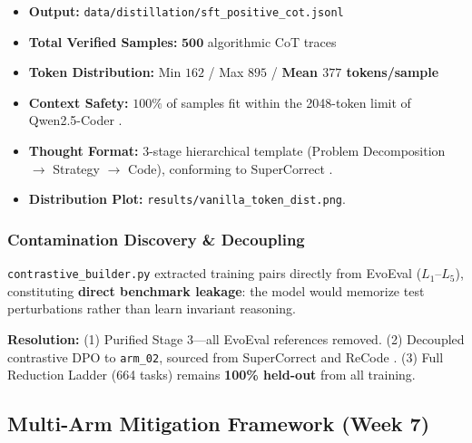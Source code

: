 \documentclass[12pt, a4paper]{article}
\begin{document}
\begin{researchbox}[title={\faDatabase\ NB-03 Distillation Statistics}]
\begin{itemize}[leftmargin=*]
  \item \textbf{Output:} \texttt{data/distillation/sft\_positive\_cot.jsonl}
  \item \textbf{Total Verified Samples:} $\mathbf{500}$ algorithmic CoT traces
  \item \textbf{Token Distribution:} Min $162$ / Max $895$ / \textbf{Mean $377$ tokens/sample}
  \item \textbf{Context Safety:} $100\%$ of samples fit within the 2048-token limit of Qwen2.5-Coder \cite{qwen25coder}.
  \item \textbf{Thought Format:} 3-stage hierarchical template (Problem Decomposition $\to$ Strategy $\to$ Code), conforming to SuperCorrect \cite{supercorrect}.
  \item \textbf{Distribution Plot:} \texttt{results/vanilla\_token\_dist.png}.
\end{itemize}
\end{researchbox}

\subsubsection{Contamination Discovery \& Decoupling}

\begin{gapbox}
\texttt{contrastive\_builder.py} extracted training pairs directly from EvoEval ($L_1$--$L_5$), constituting \textbf{direct benchmark leakage}: the model would memorize test perturbations rather than learn invariant reasoning.
\end{gapbox}

\begin{noveltybox}
\textbf{Resolution:} (1) Purified Stage 3---all EvoEval references removed. (2) Decoupled contrastive DPO to \texttt{arm\_02}, sourced from SuperCorrect \cite{supercorrect} and ReCode \cite{recode_contrastive}. (3) Full Reduction Ladder (664 tasks) remains \textbf{100\% held-out} from all training.
\end{noveltybox}

\subsection{Multi-Arm Mitigation Framework (Week 7)}
\end{document}
